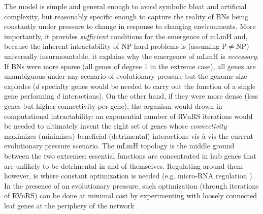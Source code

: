 The model is simple and general enough to avoid
symbolic bloat and artificial complexity, but reasonably specific enough to capture the reality of BNs being constantly under pressure to change in response to 
changing environments. More importantly, it provides \textit{sufficient} conditions for the emergence of mLmH and, 
because the inherent intractability of NP-hard problems is (assuming P$\neq$NP) universally insurmountable, 
it explains why the emergence of mLmH is \textit{necessary}.  If BNs were more sparse (all genes of degree 1 in the extreme case), all genes are unambiguous 
under any scenario of evolutionary pressure but the 
genome size explodes ($d$ specialty genes would be needed to carry out the function of a single gene performing $d$ interactions). 
On the other hand, if they were more dense (less genes but higher connectivity per gene), the organism would drown in 
computational intractability: an exponential number of RVnRS iterations would be needed to ultimately
invent the right set of genes whose \textit{connectivity} maximizes (minimizes) beneficial (detrimental) interactions vis-à-vis the current evolutionary pressure scenario. 
The mLmH topology is the middle ground between the two extremes: essential functions are concentrated in hub genes that are unlikely to be detrimental 
in and of themselves. Regulating around them however, is where constant optimization is needed (e.g. micro-RNA regulation \cite{gerstein_architecture_2012}). 
In the presence of an evolutionary pressure, such optimization  (through iterations of RVnRS) can be done at minimal cost
by experimenting with loosely connected leaf genes at the periphery of the network  \cite{kim_positive_2007}.
%
%
%
%
\begin{comment}       
        Others have pointed out that power-law distributions are the norm, the latter can emerge in complex systems simply as a result of 
        variability [53][48][45] and as such
        does not in and of itself provide an explanation of the underlying driving forces shaping the topological properties of system's component. 
        The functional aspects of biological systems are 
        
        SF, EOC and SOC  not only make different assumptions, lead to conflicting results, and do not account for functional  specificities \cite{alderson_contrasting_2010}. 
        The highly-optimized tolerance (HOT) model takes into account the      
\end{comment}
